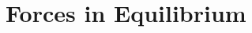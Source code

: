 \documentclass{article}
\begin{document}
\setcounter{section}{5}
\section{Forces in Equilibrium}






\end{document}
